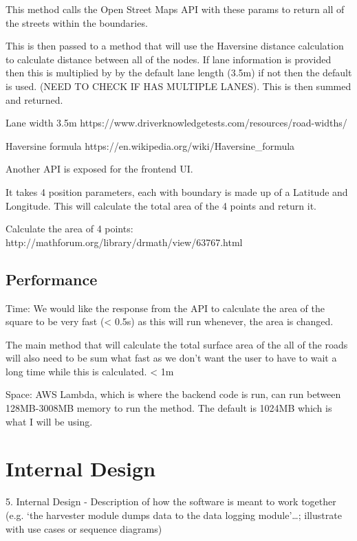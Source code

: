 \documentclass[a4paper,11pt]{article}
\begin{document}
This method calls the Open Street Maps API with these params to return all of the streets within the boundaries.

This is then passed to a method that will use the Haversine distance calculation to calculate distance between all of the nodes. If lane information is provided then this is multiplied by by the default lane length (3.5m) if not then the default is used. (NEED TO CHECK IF HAS MULTIPLE LANES). This is then summed and returned.

Lane width 3.5m https://www.driverknowledgetests.com/resources/road-widths/

Haversine formula https://en.wikipedia.org/wiki/Haversine_formula

Another API is exposed for the frontend UI.

It takes 4 position parameters, each with boundary is made up of a Latitude and Longitude. This will calculate the total area of the 4 points and return it.

Calculate the area of 4 points:
http://mathforum.org/library/drmath/view/63767.html

\subsection{Performance}


Time:
We would like the response from the API to calculate the area of the square to be very fast (< 0.5s) as this will run whenever, the area is changed.

The main method that will calculate the total surface area of the all of the roads will also need to be sum what fast as we don't want the user to have to wait a long time while this is calculated. < 1m

Space:
AWS Lambda, which is where the backend code is run, can run between 128MB-3008MB memory to run the method. The default is 1024MB which is what I will be using.


\section{Internal Design}

5. Internal Design - Description of how the software is meant to work together (e.g. ‘the harvester module dumps data to the data logging module’…; illustrate with use cases or sequence diagrams)

\end{document}
